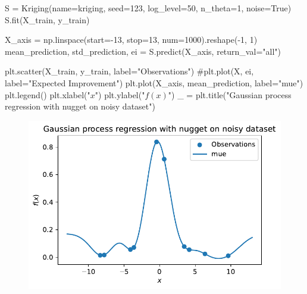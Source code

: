 \documentclass[
  letterpaper,
  DIV=11,
  numbers=noendperiod]{scrreprt}
\newenvironment{Shaded}{\begin{snugshade}}{\end{snugshade}}
\newcommand{\CommentTok}[1]{\textcolor[rgb]{0.37,0.37,0.37}{#1}}
\newcommand{\DecValTok}[1]{\textcolor[rgb]{0.68,0.00,0.00}{#1}}
\newcommand{\NormalTok}[1]{\textcolor[rgb]{0.00,0.23,0.31}{#1}}
\newcommand{\OperatorTok}[1]{\textcolor[rgb]{0.37,0.37,0.37}{#1}}
\newcommand{\StringTok}[1]{\textcolor[rgb]{0.13,0.47,0.30}{#1}}
\newcommand{\VariableTok}[1]{\textcolor[rgb]{0.07,0.07,0.07}{#1}}
\begin{document}
\begin{Shaded}
\begin{Highlighting}[]
\NormalTok{S }\OperatorTok{=}\NormalTok{ Kriging(name}\OperatorTok{=}\StringTok{\textquotesingle{}kriging\textquotesingle{}}\NormalTok{,}
\NormalTok{            seed}\OperatorTok{=}\DecValTok{123}\NormalTok{,}
\NormalTok{            log\_level}\OperatorTok{=}\DecValTok{50}\NormalTok{,}
\NormalTok{            n\_theta}\OperatorTok{=}\DecValTok{1}\NormalTok{,}
\NormalTok{            noise}\OperatorTok{=}\VariableTok{True}\NormalTok{)}
\NormalTok{S.fit(X\_train, y\_train)}

\NormalTok{X\_axis }\OperatorTok{=}\NormalTok{ np.linspace(start}\OperatorTok{={-}}\DecValTok{13}\NormalTok{, stop}\OperatorTok{=}\DecValTok{13}\NormalTok{, num}\OperatorTok{=}\DecValTok{1000}\NormalTok{).reshape(}\OperatorTok{{-}}\DecValTok{1}\NormalTok{, }\DecValTok{1}\NormalTok{)}
\NormalTok{mean\_prediction, std\_prediction, ei }\OperatorTok{=}\NormalTok{ S.predict(X\_axis, return\_val}\OperatorTok{=}\StringTok{"all"}\NormalTok{)}

\NormalTok{plt.scatter(X\_train, y\_train, label}\OperatorTok{=}\StringTok{"Observations"}\NormalTok{)}
\CommentTok{\#plt.plot(X, ei, label="Expected Improvement")}
\NormalTok{plt.plot(X\_axis, mean\_prediction, label}\OperatorTok{=}\StringTok{"mue"}\NormalTok{)}
\NormalTok{plt.legend()}
\NormalTok{plt.xlabel(}\StringTok{"$x$"}\NormalTok{)}
\NormalTok{plt.ylabel(}\StringTok{"$f(x)$"}\NormalTok{)}
\NormalTok{\_ }\OperatorTok{=}\NormalTok{ plt.title(}\StringTok{"Gaussian process regression with nugget on noisy dataset"}\NormalTok{)}
\end{Highlighting}
\end{Shaded}

\begin{figure}[H]

{\centering \includegraphics{012_num_spot_ei_files/figure-pdf/cell-57-output-1.pdf}

}

\end{figure}
\end{document}
